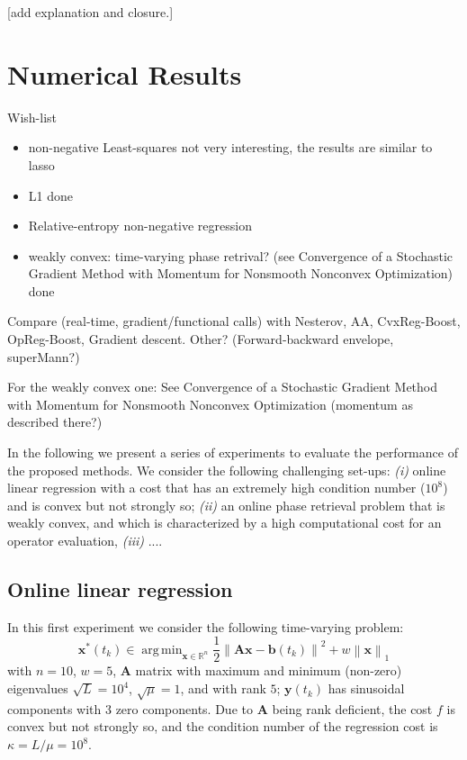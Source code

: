 \documentclass{article}
\DeclareMathOperator*{\argmin}{arg\,min}
\newcommand{\norm}[1]{\left\lVert#1\right\rVert}
\newcommand{\R}{\mathbb{R}}
\newcommand{\bv}{\mathbold{b}}
\newcommand{\x}{\mathbold{x}}
\newcommand{\y}{\mathbold{y}}
\newcommand{\Am}{\mathbold{A}}
\newcommand{\nicola}[1]{{\color{blue}#1}}
\newcommand{\andrea}[1]{{\color{red}[#1]}}
\begin{document}
\andrea{add explanation and closure.}



\section{Numerical Results}\label{sec:numerical}

Wish-list

\begin{itemize}
\item non-negative Least-squares \nicola{not very interesting, the results are similar to lasso}

\item L1 \nicola{done}

\item Relative-entropy non-negative regression

\item weakly convex: time-varying phase retrival? (see Convergence of a Stochastic Gradient Method with Momentum for Nonsmooth Nonconvex Optimization) \nicola{done}

\end{itemize}

Compare (real-time, gradient/functional calls) with Nesterov, AA, CvxReg-Boost, OpReg-Boost, Gradient descent. Other? (Forward-backward envelope, superMann?)

For the weakly convex one: See Convergence of a Stochastic Gradient Method with Momentum for Nonsmooth Nonconvex Optimization (momentum as described there?)


In the following we present a series of experiments to evaluate the performance of the proposed methods. We consider the following challenging set-ups: \emph{(i)} online linear regression with a cost that has an extremely high condition number ($10^8$) and is convex but not strongly so; \emph{(ii)} an online phase retrieval problem that is weakly convex, and which is characterized by a high computational cost for an operator evaluation, \nicola{\emph{(iii)} ....}


\subsection{Online linear regression}
In this first experiment we consider the following time-varying problem:
\begin{equation}\label{eq:linear-regression}
	\x^*(t_k) \in \argmin_{\x \in \R^n} \frac{1}{2} \norm{\Am \x - \bv(t_k)}^2 + w \norm{\x}_1
\end{equation}
with $n = 10$, $w = 5$, $\Am$ matrix with maximum and minimum (non-zero) eigenvalues $\sqrt{L} = 10^4$, $\sqrt{\mu} = 1$, and with rank $5$; $\y(t_k)$ has sinusoidal components with $3$ zero components. Due to $\Am$ being rank deficient, the cost $f$ is convex but not strongly so, and the condition number of the regression cost is $\kappa = L / \mu = 10^8$.
\end{document}

